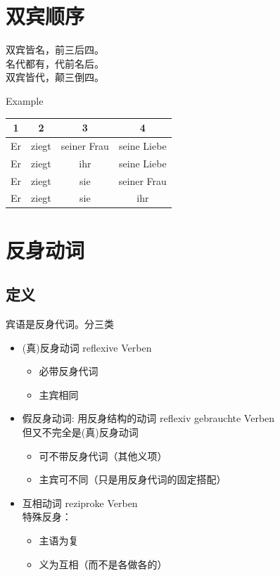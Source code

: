 \section{双宾顺序}

\label{subsec:verb:double_object_order}
\begin{myquote}
    \begin{center}
        双宾皆名，前三后四。\\
        名代都有，代前名后。\\
        双宾皆代，颠三倒四。\\
    \end{center}
\end{myquote}

Example
\begin{center}
    \begin{tabular}{|c|c|c|c|}
        \hline
        \rowcolor{gray}
        1  & 2     & 3           & 4           \\
        \hline
        Er & ziegt & seiner Frau & seine Liebe \\
        \hline
        Er & ziegt & ihr         & seine Liebe \\
        \hline
        Er & ziegt & sie         & seiner Frau \\
        \hline
        Er & ziegt & sie         & ihr         \\
        \hline
    \end{tabular}
\end{center}

\section{反身动词}
\subsection{定义}
宾语是反身代词。分三类
\begin{itemize}
    \item (真)反身动词 reflexive Verben
          \begin{itemize}
              \item 必带反身代词
              \item 主宾相同
          \end{itemize}
    \item 假反身动词: 用反身结构的动词 reflexiv gebrauchte Verben \\
          但又不完全是(真)反身动词
          \begin{itemize}
              \item 可不带反身代词（其他义项）
              \item 主宾可不同（只是用反身代词的固定搭配）
          \end{itemize}
    \item 互相动词 reziproke Verben \\
          特殊反身：
          \begin{itemize}
              \item 主语为复
              \item 义为互相（而不是各做各的）
          \end{itemize}
\end{itemize}

